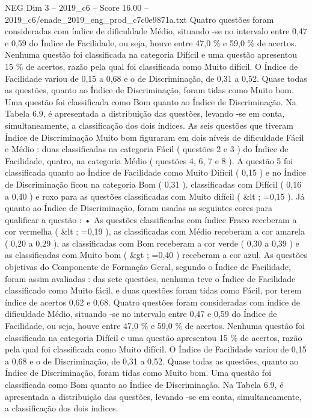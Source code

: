 \begin{textsample}{NEG Dim 3 – 2019\_c6 – Score 16.00 – 2019\_c6/enade\_2019\_eng\_prod\_c7c0e9871a.txt}
Quatro questões foram consideradas com índice de dificuldade Médio, situando -se no intervalo entre 0,47 e 0,59 do Índice de Facilidade, ou seja, houve entre 47,0 \% e 59,0 \% de acertos.
Nenhuma questão foi classificada na categoria Difícil e uma questão apresentou 15 \% de acertos, razão pela qual foi classificada como Muito difícil.
O Índice de Facilidade variou de 0,15 a 0,68 e o de Discriminação, de 0,31 a 0,52.
Quase todas as questões, quanto ao Índice de Discriminação, foram tidas como Muito bom.
Uma questão foi classificada como Bom quanto ao Índice de Discriminação.
Na Tabela 6.9, é apresentada a distribuição das questões, levando -se em conta, simultaneamente, a classificação dos dois índices.
As seis questões que tiveram Índice de Discriminação Muito bom figuraram em dois níveis de dificuldade Fácil e Médio : duas classificadas na categoria Fácil ( questões 2 e 3 ) do Índice de Facilidade, quatro, na categoria Médio ( questões 4, 6, 7 e 8 ).
A questão 5 foi classificada quanto ao Índice de Facilidade como Muito Difícil ( 0,15 ) e no Índice de Discriminação ficou na categoria Bom ( 0,31 ). classificadas com Difícil ( 0,16 a 0,40 ) e roxo para as questões classificadas com Muito difícil ( \&lt ; =0,15 ).
Já quanto ao Índice de Discriminação, foram usadas as seguintes cores para qualificar a questão : • As questões classificadas com índice Fraco receberam a cor vermelha ( \&lt ; =0,19 ), as classificadas com Médio receberam a cor amarela ( 0,20 a 0,29 ), as classificadas com Bom receberam a cor verde ( 0,30 a 0,39 ) e as classificadas com Muito bom ( \&gt ; =0,40 ) receberam a cor azul.
As questões objetivas do Componente de Formação Geral, segundo o Índice de Facilidade, foram assim avaliadas : das sete questões, nenhuma teve o Índice de Facilidade classificado como Muito fácil, e duas questões foram tidas como Fácil, por terem índice de acertos 0,62 e 0,68.
Quatro questões foram consideradas com índice de dificuldade Médio, situando -se no intervalo entre 0,47 e 0,59 do Índice de Facilidade, ou seja, houve entre 47,0 \% e 59,0 \% de acertos.
Nenhuma questão foi classificada na categoria Difícil e uma questão apresentou 15 \% de acertos, razão pela qual foi classificada como Muito difícil.
O Índice de Facilidade variou de 0,15 a 0,68 e o de Discriminação, de 0,31 a 0,52.
Quase todas as questões, quanto ao Índice de Discriminação, foram tidas como Muito bom.
Uma questão foi classificada como Bom quanto ao Índice de Discriminação.
Na Tabela 6.9, é apresentada a distribuição das questões, levando -se em conta, simultaneamente, a classificação dos dois índices.

\end{textsample}
